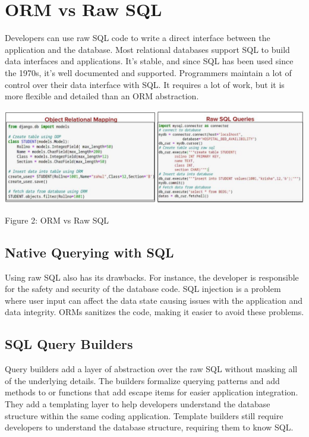 \documentclass[10pt,a4paper,twoside]{article}
\begin{document}
\section{ORM vs Raw SQL}
Developers can use raw SQL code to write a direct interface between the application and the database. Most relational databases support SQL to build data interfaces and applications. It’s stable, and since SQL has been used since the 1970s, it’s well documented and supported. Programmers maintain a lot of control over their data interface with SQL. It requires a lot of work, but it is more flexible and detailed than an ORM abstraction.
\item
\begin{figure2}
  \includegraphics[width=\linewidth]{./images/orm2.jpg}
  \caption{Figure 2: ORM vs Raw SQL}
  \label{fig:ORM vs SQL}
\end{figure2}

\subsection{Native Querying with SQL}
\item Using raw SQL also has its drawbacks. For instance, the developer is responsible for the safety and security of the database code. SQL injection is a problem where user input can affect the data state causing issues with the application and data integrity. ORMs sanitizes the code, making it easier to avoid these problems.

\subsection{SQL Query Builders}
\item Query builders add a layer of abstraction over the raw SQL without masking all of the underlying details. The builders formalize querying patterns and add methods to or functions that add escape items for easier application integration. They add a templating layer to help developers understand the database structure within the same coding application. Template builders still require developers to understand the database structure, requiring them to know SQL.
\end{document}
